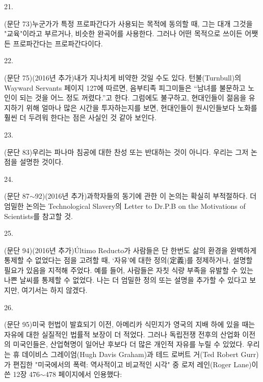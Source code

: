 \documentclass[11pt,a4paper]{article}
\begin{document}
\begin{multicols}{2}
\hypertarget{21}{21.} (문단 73)누군가가 특정 프로파간다가 사용되는 목적에 동의할 때, 그는 대개 그것을 "교육"이라고  부르거나, 비슷한 완곡어를 사용한다. 그러나 어떤 목적으로 쓰이든 어쨋든 프로파간다는  프로파간다이다. 


\hypertarget{22}{22.} (문단 75)(2016년 추가)내가 지나치게 비약한 것일 수도 있다. 턴불(Turnbull)의 \textlangle{}Wayward  Servants\textrangle{} 페이지 127에 따르면, 음부티족 피그미들은 “남녀를 불문하고 노인이 되는 것을 어느 정도  꺼렸다.”고 한다. 그럼에도 불구하고, 현대인들이 젊음을 유지하기 위해 얼마나 많은 시간을  투자하는지를 보면, 현대인들이 원시인들보다 노화를 훨씬 더 두려워 한다는 점은 사실인 것 같아 보인다.


\hypertarget{23}{23.} (문단 83)우리는 파나마 침공에 대한 찬성 또는 반대하는 것이 아니다. 우리는 그저 논점을 설명한  것이다. 


\hypertarget{24}{24.} (문단 87${\sim}$92)(2016년 추가)과학자들의 동기에 관한 이 논의는 확실히 부적절하다. 더 엄밀한  논의는 \textlangle{}Technological Slavery\textrangle{}의 \textlangle{}Letter to Dr.P.B on the Motivations of Scientists\textrangle{}를 참고할 것. 


\hypertarget{25}{25.} (문단 94)(2016년 추가)Último Reducto가 사람들은 단 한번도 삶의 환경을 완벽하게 통제할 수  없었다는 점을 고려할 때, ‘자유’에 대한 정의(定義)를 정제하거나, 설명할 필요가 있음을 지적해 주었다.  예를 들어, 사람들은 자칫 식량 부족을 유발할 수 있는 나쁜 날씨를 통제할 수 없었다. 나는 더 엄밀한  정의 또는 설명을 추가할 수 있다고 보지만, 여기서는 하지 않겠다. 




\hypertarget{26}{26.} (문단 95)미국 헌법이 발효되기 이전, 아메리카 식민지가 영국의 지배 하에 있을 때는 자유에 대한  실질적인 법률적 보장이 더 적었다. 그러나 독립전쟁 전후의 산업화 이전의 미국인들은, 산업혁명이  일어난 후보다 더 많은 개인적 자유를 누릴 수 있었다. 우리는 휴 데이비스 그레이엄(Hugh Davis  Graham)과 테드 로버트 거(Ted Robert Gurr)가 편집한 "미국에서의 폭력: 역사적이고 비교적인 시각" 중 로저 레인(Roger Lane)이 쓴 12장 476${\sim}$478 페이지에서 인용했다:



\end{multicols}
\end{document}
